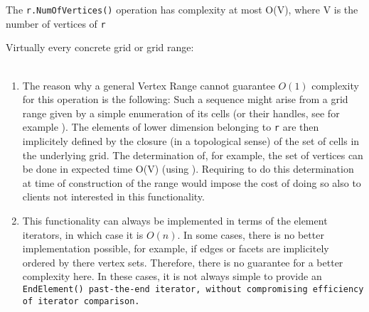  The {\tt r.NumOfVertices()} operation has complexity at most O(V), where
 V is  the number of vertices of {\tt r} 
 
 Virtually every concrete grid  or grid range:
 \\
 \\
 
 \begin{enumerate}
 \item {}
   The reason why a general Vertex Range cannot guarantee $O(1)$ complexity for
   this operation is the following: 
   Such a sequence  might arise from a grid range
   given by a simple enumeration
   of its cells 
   (or their handles,
   see for example   ).
   The elements of lower dimension belonging to {\tt r} are then implicitely defined
   by the closure (in a topological sense) of the set of cells in the underlying grid.
   The determination of, for example, the set of vertices can be done in expected time
   O(V) (using ).
   Requiring to do this determination at time of construction of the range would 
   impose the cost of doing so also to clients not interested in this functionality.
\item {} This functionality can always be implemented
   in terms of the element iterators, in which case it is $O(n)$. In some cases,
   there is no better implementation possible, for example, if edges or facets
   are implicitely ordered by there vertex sets. Therefore, there is no guarantee
   for a better complexity here.
   In these cases, it is not always simple to provide an \tt{EndElement()}
   past-the-end iterator, without compromising efficiency of iterator comparison.
 \end{enumerate}
  

